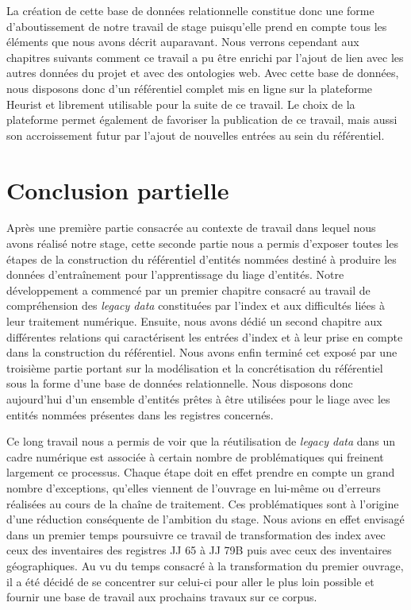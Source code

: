 \documentclass[a4paper,12pt,twoside]{book}
\begin{document}
	La création de cette base de données relationnelle constitue donc une forme d'aboutissement de notre travail de stage puisqu'elle prend en compte tous les éléments que nous avons décrit auparavant. Nous verrons cependant aux chapitres suivants comment ce travail a pu être enrichi par l'ajout de lien avec les autres données du projet et avec des ontologies web. Avec cette base de données, nous disposons donc d'un référentiel complet mis en ligne sur la plateforme Heurist et librement utilisable pour la suite de ce travail. Le choix de la plateforme permet également de favoriser la publication de ce travail, mais aussi son accroissement futur par l'ajout de nouvelles entrées au sein du référentiel.
	
	\chapter*{Conclusion partielle}
	
	Après une première partie consacrée au contexte de travail dans lequel nous avons réalisé notre stage, cette seconde partie nous a permis d'exposer toutes les étapes de la construction du référentiel d'entités nommées destiné à produire les données d'entraînement pour l'apprentissage du liage d'entités. Notre développement a commencé par un premier chapitre consacré au travail de compréhension des \textit{legacy data} constituées par l'index et aux difficultés liées à leur traitement numérique. Ensuite, nous avons dédié un second chapitre aux différentes relations qui caractérisent les entrées d'index et à leur prise en compte dans la construction du référentiel. Nous avons enfin terminé cet exposé par une troisième partie portant sur la modélisation et la concrétisation du référentiel sous la forme d'une base de données relationnelle. Nous disposons donc aujourd'hui d'un ensemble d'entités prêtes à être utilisées pour le liage avec les entités nommées présentes dans les registres concernés.
	
	Ce long travail nous a permis de voir que la réutilisation de \textit{legacy data} dans un cadre numérique est associée à certain nombre de problématiques qui freinent largement ce processus. Chaque étape doit en effet prendre en compte un grand nombre d'exceptions, qu'elles viennent de l'ouvrage en lui-même ou d'erreurs réalisées au cours de la chaîne de traitement. Ces problématiques sont à l'origine d'une réduction conséquente de l'ambition du stage. Nous avions en effet envisagé dans un premier temps poursuivre ce travail de transformation des index avec ceux des inventaires des registres JJ 65 à JJ 79B puis avec ceux des inventaires géographiques. Au vu du temps consacré à la transformation du premier ouvrage, il a été décidé de se concentrer sur celui-ci pour aller le plus loin possible et fournir une base de travail aux prochains travaux sur ce corpus.
	
\end{document}
